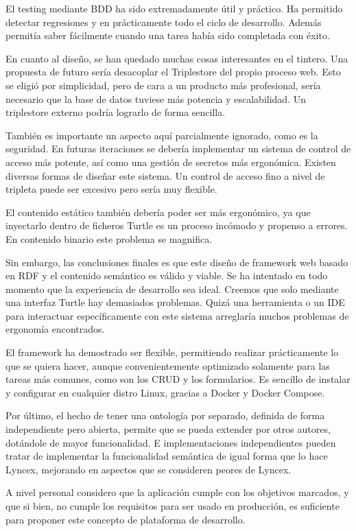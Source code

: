 \documentclass[12pt]{report} %
\begin{document}
El testing mediante BDD ha sido extremadamente útil y práctico. Ha permitido detectar regresiones y en prácticamente todo el ciclo de desarrollo. Además permitía saber fácilmente cuando una tarea había sido completada con éxito.

En cuanto al diseño, se han quedado muchas cosas interesantes en el tintero. Una propuesta de futuro sería desacoplar el Triplestore del propio proceso web. Esto se eligió por simplicidad, pero de cara a un producto más profesional, sería necesario que la base de datos tuviese más potencia y escalabilidad. Un triplestore externo podría lograrlo de forma sencilla.

También es importante un aspecto aquí parcialmente ignorado, como es la seguridad. En futuras iteraciones se debería implementar un sistema de control de acceso más potente, así como una gestión de secretos más ergonómica. Existen diversas formas de diseñar este sistema. Un control de acceso fino a nivel de tripleta puede ser excesivo pero sería muy flexible.

El contenido estático también debería poder ser más ergonómico, ya que inyectarlo dentro de ficheros Turtle es un proceso incómodo y propenso a errores. En contenido binario este problema se magnifica.

Sin embargo, las conclusiones finales es que este diseño de framework web basado en RDF y el contenido semántico es válido y viable. Se ha intentado en todo momento que la experiencia de desarrollo sea ideal. Creemos que solo mediante una interfaz Turtle hay demasiados problemas. Quizá una herramienta o un IDE para interactuar específicamente con este sistema arreglaría muchos problemas de ergonomía encontrados.

El framework ha demostrado ser flexible, permitiendo realizar prácticamente lo que se quiera hacer, aunque convenientemente optimizado solamente para las tareas más comunes, como son los CRUD y los formularios. Es sencillo de instalar y configurar en cualquier distro Linux, gracias a Docker y Docker Compose.

Por último, el hecho de tener una ontología por separado, definida de forma independiente pero abierta, permite que se pueda extender por otros autores, dotándole de mayor funcionalidad. E implementaciones independientes pueden tratar de implementar la funcionalidad semántica de igual forma que lo hace Lyncex, mejorando en aspectos que se consideren peores de Lyncex.

A nivel personal considero que la aplicación cumple con los objetivos marcados, y que si bien, no cumple los requisitos para ser usado en producción, es suficiente para proponer este concepto de plataforma de desarrollo.
\end{document}
